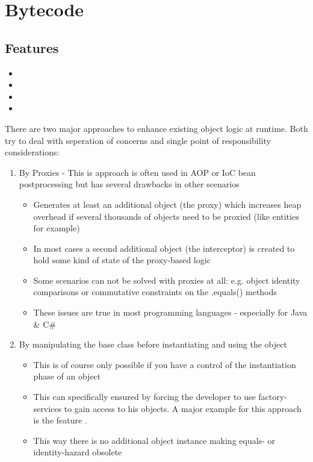 \section{Bytecode}
\label{module:Bytecode}
\ClearAPI
\TODO
\subsection{Features}
\begin{itemize}
	\item {}
	\item {}
	\item {}
	\item {}
\end{itemize}

There are two major approaches to enhance existing object logic at runtime. Both try to deal with seperation of concerns and single point of responsibility considerations:
\begin{enumerate}
	\item By Proxies - This is approach is often used in AOP or IoC bean postprocessing but has several drawbacks in other scenarios
		\begin{itemize}
			\item Generates at least an additional object (the proxy) which increases heap overhead if several thousands of objects need to be proxied (like entities for example)
			\item In most cases a second additional object (the interceptor) is created to hold some kind of state of the proxy-based logic
			\item Some scenarios can not be solved with proxies at all: e.g. object identity comparisons or commutative constraints on the .equals() methods\cite{com14}
			\item These issues are true in most programming languages - especially for Java \& C\#
		\end{itemize}
	\item By manipulating the base class before instantiating and using the object
		\begin{itemize}
			\item This is of course only possible if you have a control of the instantiation phase of an object
			\item This can specifically ensured by forcing the developer to use factory-services to gain access to his objects. A major example for this approach is the feature .
			\item This way there is no additional object instance making equals- or identity-hazard obsolete
		\end{itemize}
\end{enumerate}


